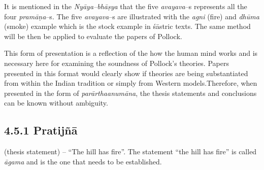 It is mentioned in the \textit{Nyāya–bhāṣya} that the five \textit{avayava}–s represents all the four \textit{pramāṇa}–s. The five \textit{avayava}–s are illustrated with the \textit{agni} (fire) and \textit{dhūma} (smoke) example which is the stock example in śāstric texts. The same method will be then be applied to evaluate the papers of Pollock.

This form of presentation is a reflection of the how the human mind works and is necessary here for examining the soundness of Pollock’s theories. Papers presented in this format would clearly show if theories are being substantiated from within the Indian tradition or simply from Western models.Therefore, when presented in the form of \textit{parārthaanumāna}, the thesis statements and conclusions can be known without ambiguity.

\vspace{-.3cm}

\subsection*{4.5.1 Pratijñā}

(thesis statement) – “The hill has fire”. The statement “the hill has fire” is called \textit{āgama} and is the one that needs to be established.


